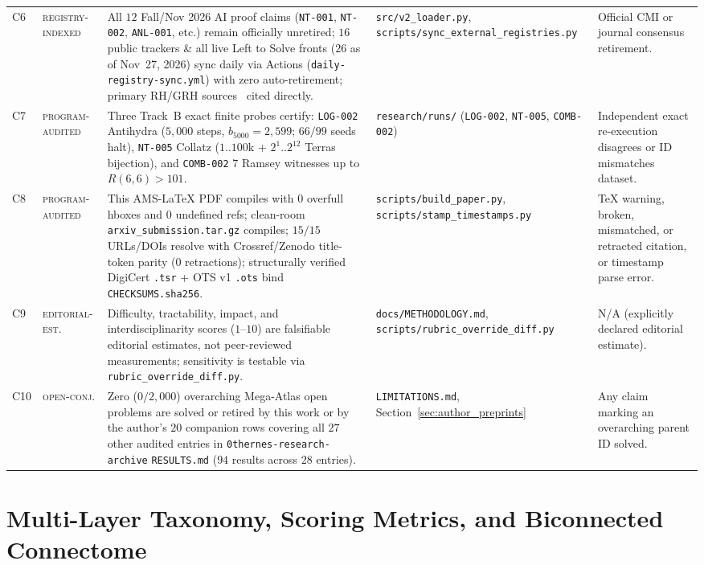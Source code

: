 \documentclass[11pt,reqno]{amsart}
\theoremstyle{plain}
\theoremstyle{definition}
\newcommand{\tcode}[1]{{\scriptsize\nolinkurl{#1}}}
\newcommand{\tagpa}{\textsc{program-audited}}
\newcommand{\tagri}{\textsc{registry-indexed}}
\newcommand{\tagee}{\textsc{editorial-est.}}
\newcommand{\tagoc}{\textsc{open-conj.}}
\begin{document}
\begin{table}[t]
\begin{tabularx}{\textwidth}{@{}P{0.55cm}P{1.95cm}YP{2.95cm}P{2.55cm}@{}}
C6 & \tagri & All $12$ Fall/Nov 2026 AI proof claims (\tcode{NT-001}, \tcode{NT-002}, \tcode{ANL-001}, etc.) remain officially unretired; $16$ public trackers \& all live Left to Solve fronts ($26$ as of Nov~27, 2026) sync daily via Actions (\tcode{daily-registry-sync.yml}) with zero auto-retirement; primary RH/GRH sources~\cite{leanfro2026rh,rubinstein2026grh} cited directly. & \tcode{src/v2_loader.py}, \tcode{scripts/sync_external_registries.py} & Official CMI or journal consensus retirement. \\
C7 & \tagpa & Three Track~B exact finite probes certify: \tcode{LOG-002} Antihydra ($5{,}000$ steps, $b_{5000}=2{,}599$; $66/99$ seeds halt), \tcode{NT-005} Collatz ($1..100\text{k}$ + $2^1..2^{12}$ Terras bijection), and \tcode{COMB-002} $7$ Ramsey witnesses up to $R(6,6)>101$. & \tcode{research/runs/} (\tcode{LOG-002}, \tcode{NT-005}, \tcode{COMB-002}) & Independent exact re-execution disagrees or ID mismatches dataset. \\
C8 & \tagpa & This AMS-LaTeX PDF compiles with $0$ overfull hboxes and $0$ undefined refs; clean-room \tcode{arxiv_submission.tar.gz} compiles; $15/15$ URLs/DOIs resolve with Crossref/Zenodo title-token parity ($0$ retractions); structurally verified DigiCert \tcode{.tsr} + OTS v1 \tcode{.ots} bind \tcode{CHECKSUMS.sha256}. & \tcode{scripts/build_paper.py}, \tcode{scripts/stamp_timestamps.py} & TeX warning, broken, mismatched, or retracted citation, or timestamp parse error. \\
C9 & \tagee & Difficulty, tractability, impact, and interdisciplinarity scores ($1$--$10$) are falsifiable editorial estimates, not peer-reviewed measurements; sensitivity is testable via \tcode{rubric_override_diff.py}. & \tcode{docs/METHODOLOGY.md}, \tcode{scripts/rubric_override_diff.py} & N/A (explicitly declared editorial estimate). \\
C10 & \tagoc & Zero ($0/2{,}000$) overarching Mega-Atlas open problems are solved or retired by this work or by the author's $20$ companion rows covering all $27$ other audited entries in \tcode{0thernes-research-archive} \tcode{RESULTS.md} ($94$ results across $28$ entries). & \tcode{LIMITATIONS.md}, Section~\ref{sec:author_preprints} & Any claim marking an overarching parent ID solved. \\
\bottomrule
\end{tabularx}
\end{table}

\section{Multi-Layer Taxonomy, Scoring Metrics, and Biconnected Connectome}
\label{sec:taxonomy}
\end{document}
